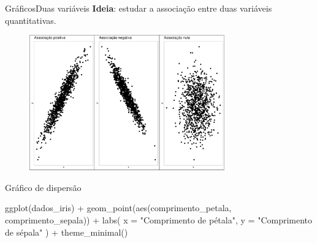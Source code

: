 \documentclass[
  10pt,
  ignorenonframetext,
]{beamer}
\newenvironment{Shaded}{\begin{snugshade}}{\end{snugshade}}
\newcommand{\AttributeTok}[1]{\textcolor[rgb]{0.40,0.45,0.13}{#1}}
\newcommand{\FunctionTok}[1]{\textcolor[rgb]{0.28,0.35,0.67}{#1}}
\newcommand{\NormalTok}[1]{\textcolor[rgb]{0.00,0.23,0.31}{#1}}
\newcommand{\SpecialCharTok}[1]{\textcolor[rgb]{0.37,0.37,0.37}{#1}}
\newcommand{\StringTok}[1]{\textcolor[rgb]{0.13,0.47,0.30}{#1}}
\begin{document}
\begin{frame}{Gráficos\newline Duas variáveis}
\protect\hypertarget{gruxe1ficosduas-variuxe1veis}{}
\textbf{Ideia}: estudar a associação entre duas variáveis quantitativas.

\begin{figure}

{\centering \includegraphics[width=0.75\textwidth,height=\textheight]{exploracao-visualizacao_files/figure-beamer/unnamed-chunk-126-1.pdf}

}

\end{figure}
\end{frame}

\begin{frame}[fragile]{Gráfico de dispersão}
\protect\hypertarget{gruxe1fico-de-dispersuxe3o}{}
\begin{Shaded}
\begin{Highlighting}[]
\FunctionTok{ggplot}\NormalTok{(dados\_iris) }\SpecialCharTok{+}
  \FunctionTok{geom\_point}\NormalTok{(}\FunctionTok{aes}\NormalTok{(comprimento\_petala, comprimento\_sepala)) }\SpecialCharTok{+}
  \FunctionTok{labs}\NormalTok{(}
    \AttributeTok{x =} \StringTok{"Comprimento de pétala"}\NormalTok{,}
    \AttributeTok{y =} \StringTok{"Comprimento de sépala"}
\NormalTok{  ) }\SpecialCharTok{+}
  \FunctionTok{theme\_minimal}\NormalTok{()}
\end{Highlighting}
\end{Shaded}
\end{frame}
\end{document}
